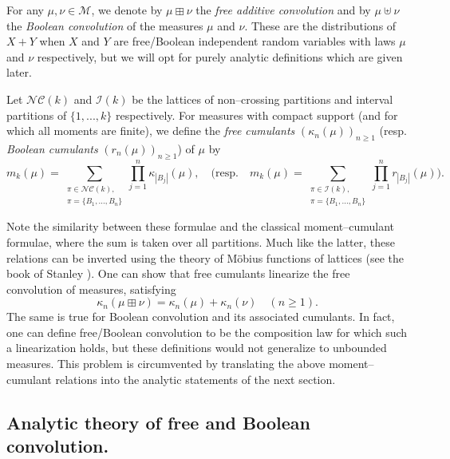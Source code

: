 \documentclass{amsart}
\theoremstyle{definition}
\theoremstyle{remark}
\numberwithin{equation}{section}
\begin{document}
For any $\mu,\nu\in\mathcal{M}$, we denote by $\mu\boxplus \nu$ the \textit{free additive convolution} and by $\mu\uplus\nu$ the \textit{Boolean convolution} of the measures $\mu$ and $\nu$. These are the distributions of $X+Y$ when $X$ and $Y$ are free/Boolean independent random variables with laws $\mu$ and $\nu$ respectively, but we will opt for purely analytic definitions which are given later.

Let $\mathcal{NC}(k)$ and $\mathcal{I}(k)$ be the lattices of non--crossing partitions and interval partitions of $\{1,...,k\}$ respectively. For measures with compact support (and for which all moments are finite), we define the \textit{free cumulants} $(\kappa_n(\mu))_{n\geq 1}$ (resp. \textit{Boolean cumulants} $(r_n(\mu))_{n\geq 1}$) of $\mu$ by
\begin{equation}\label{momentcumulantfree}
    m_k(\mu) = \sum_{\substack{\pi \in \mathcal{NC}(k), \\\pi = \{B_1,...,B_n\}} } \prod_{j=1}^n \kappa_{|B_j|}(\mu),\quad \bigg(\text{resp.} \quad   m_k(\mu) = \sum_{\substack{\pi \in \mathcal{I}(k), \\\pi = \{B_1,...,B_n\} }} \prod_{j=1}^n r_{|B_j|}(\mu)\bigg).
\end{equation}

Note the similarity between these formulae and the classical moment--cumulant formulae, where the sum is taken over all partitions. Much like the latter, these relations can be inverted using the theory of M{\"o}bius functions of lattices (see the book of Stanley \cite{stanley}). One can show that free cumulants linearize the free convolution of measures, satisfying
\begin{equation}\label{cumulantconv}
     \kappa_n(\mu\boxplus \nu) = \kappa_n(\mu)+\kappa_n(\nu) \quad (n\geq 1).
\end{equation}
The same is true for {Boolean convolution} and its associated cumulants. In fact, one can define free/Boolean convolution to be the composition law for which such a linearization holds, but these definitions would not generalize to unbounded measures. This problem is circumvented by translating the above moment--cumulant relations into the analytic statements of the next section. 

\subsection{Analytic theory of free and Boolean convolution.}\label{analytictheory}
\end{document}
